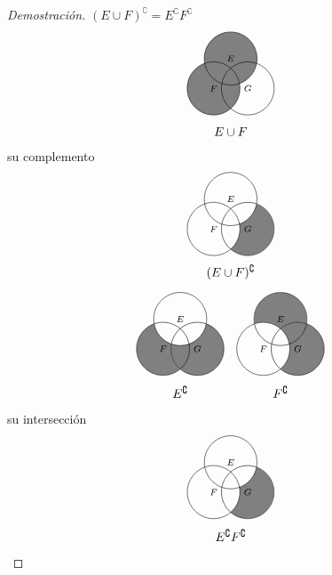 \begin{enumerate}
    \begin{proof}[Demostración] $(E \cup F)^\complement  = E^\complement F^\complement $
        \[
        \begin{tikzpicture}[scale=0.75]
        \fill[fill=black!50] ( 90:.75) circle (1) (210:.75) circle (1);
        \foreach \a/\l in {90/E,210/F,330/G} {
            \path[draw] ++(\a:.75) circle (1) node {$\scriptstyle \l$};
        }
        \node at (0, -2) {$E \cup F$};
        \end{tikzpicture}
        \]
        su complemento
        \[
        \begin{tikzpicture}[scale=0.75]
        \scope[even odd rule]
            \clip ( 90:.75) circle (1) (330:.75) circle (1);
            \clip (210:.75) circle (1) (330:.75) circle (1);
            \fill[fill=black!50] (330:.75) circle (1);
        \endscope
        \foreach \a/\l in {90/E,210/F,330/G} {
            \path[draw] ++(\a:.75) circle (1) node {$\scriptstyle \l$};
        }
        \node at (0, -2) {$(E \cup F)^\complement $};
        \end{tikzpicture}
        \]
        \[
        \begin{tikzpicture}[scale=0.75]
        \scope[even odd rule]
            \clip (210:.75) circle (1) (330:.75) circle (1);
            \clip ( 90:.75) circle (1) (210:.75) circle (1);
            \fill[fill=black!50] (210:.75) circle (1);
        \endscope
        \scope[even odd rule]
            \clip ( 90:.75) circle (1) (330:.75) circle (1);
            \fill[fill=black!50] (330:.75) circle (1);
        \endscope
        \foreach \a/\l in {90/E,210/F,330/G} {
            \path[draw] ++(\a:.75) circle (1) node {$\scriptstyle \l$};
        }
        \node at (0, -2) {$E^\complement $};
        \end{tikzpicture}
        \hspace{1em}
        \begin{tikzpicture}[scale=0.75]
        \scope[even odd rule]
            \clip ( 90:.75) circle (1) (210:.75) circle (1);
            \clip (330:.75) circle (1) ( 90:.75) circle (1);
            \fill[fill=black!50] ( 90:.75) circle (1);
        \endscope
        \scope[even odd rule]
            \clip (210:.75) circle (1) (330:.75) circle (1);
            \fill[fill=black!50] (330:.75) circle (1);
        \endscope
        \foreach \a/\l in {90/E,210/F,330/G} {
            \path[draw] ++(\a:.75) circle (1) node {$\scriptstyle \l$};
        }
        \node at (0, -2) {$F^\complement $};
        \end{tikzpicture}
        \]
        su intersección
        \[
        \begin{tikzpicture}[scale=0.75]
        \scope[even odd rule]
            \clip ( 90:.75) circle (1) (330:.75) circle (1);
            \clip (210:.75) circle (1) (330:.75) circle (1);
            \fill[fill=black!50] (330:.75) circle (1);
        \endscope
        \foreach \a/\l in {90/E,210/F,330/G} {
            \path[draw] ++(\a:.75) circle (1) node {$\scriptstyle \l$};
        }
        \node at (0, -2) {$E^\complement  F^\complement $};
        \end{tikzpicture}
        \qedhere \]
    \end{proof}
    

\end{enumerate}
